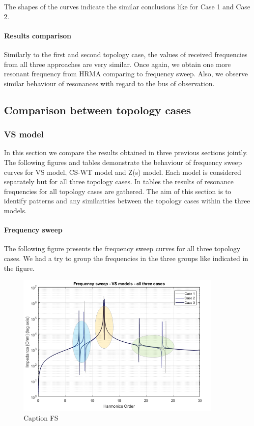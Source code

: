 \documentclass[12pt]{report} %
\begin{document}
The shapes of the curves indicate the similar conclusions like for Case 1 and Case 2.

\paragraph{Results comparison}
Similarly to the first and second topology case, the values of received frequencies from all three approaches are very similar. Once again, we obtain one more resonant frequency from HRMA comparing to frequency sweep. Also, we observe similar behaviour of resonances with regard to the bus of observation.

\subsection{Comparison between topology cases} \label{sec:comparisoncases}

\subsubsection{VS model}
In this section we compare the results obtained in three previous sections jointly. The following figures and tables demonstrate the behaviour of frequency sweep curves for VS model, CS-WT model and Z(s) model. Each model is considered separately but for all three topology cases. In tables the results of resonance frequencies for all topology cases are gathered. The aim of this section is to identify patterns and any similarities between the topology cases within the three models. 

\paragraph{Frequency sweep}
The following figure presents the frequency sweep curves for all three topology cases. We had a try to group the frequencies in the three groups like indicated in the figure.

\begin{figure}[htb]
	\centering
	\includegraphics[width=0.9\textwidth]{img/Case123/FS_VS_log_colored.png}
	\caption{Caption FS}
  	\label{fig:comparison_fsvs}
\end{figure}
\FloatBarrier
\end{document}

